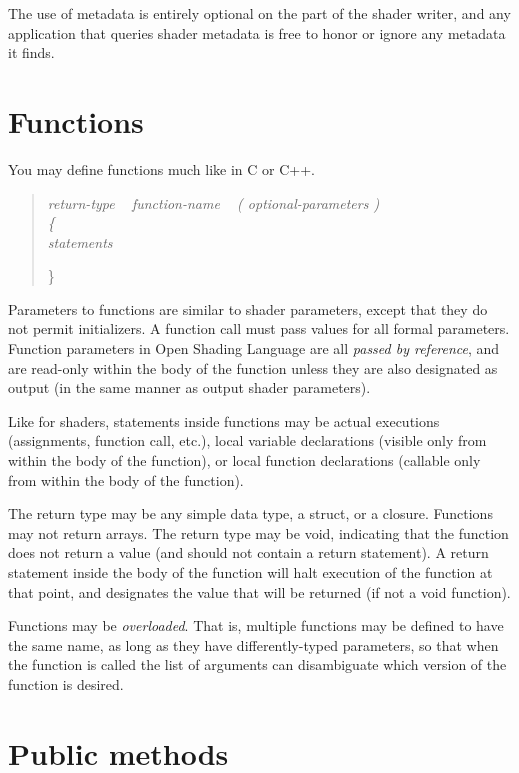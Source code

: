 \documentclass[11pt,letterpaper]{book}
\def\langname{Open Shading Language\xspace}
\begin{document}
The use of metadata is entirely optional on the part of the shader
writer, and any application that queries shader metadata is free to
honor or ignore any metadata it finds.


\newpage
\section{Functions}
\label{sec:functions}

You may define functions much like in C or C++.

\begin{quote}
\em
return-type ~ function-name ~ {\rm\cf (} optional-parameters {\rm\cf )} \\
\rm
{\cf \{ } \\
\em
\spc statements

{\cf \} }
\end{quote}

Parameters to functions are similar to shader parameters, except that
they do not permit initializers.  A function call must pass values for
all formal parameters.  Function parameters in \langname are all
\emph{passed by reference}, and are read-only within the body of the
function unless they are also designated as {\cf output} (in the same
manner as output shader parameters).

Like for shaders, statements inside functions may be actual executions
(assignments, function call, etc.), local variable declarations (visible
only from within the body of the function), or local function
declarations (callable only from within the body of the function).

The return type may be any simple data type, a {\cf struct}, or a {\cf
  closure}.  Functions may not return arrays.  The return type may be
{\cf void}, indicating that the function does not return a value (and
should not contain a {\cf return} statement).  A {\cf return} statement
inside the body of the function will halt execution of the function at
that point, and designates the value that will be returned (if not a
{\cf void} function).

Functions may be \emph{overloaded}.  That is, multiple functions may be
defined to have the same name, as long as they have differently-typed
parameters, so that when the function is called the list of arguments
can disambiguate which version of the function is desired.

\section{Public methods}
\label{sec:publicmethods}
\end{document}
